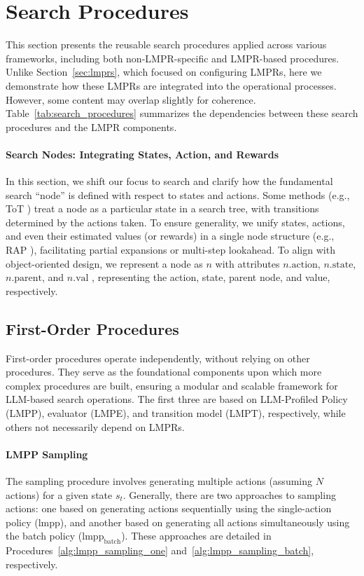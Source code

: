 

\section{Search Procedures}
\label{sec:procedures}
This section presents the reusable search procedures applied across various frameworks, including both non-LMPR-specific and LMPR-based procedures. Unlike Section~\ref{sec:lmprs}, which focused on configuring LMPRs, here we demonstrate how these LMPRs are integrated into the operational processes. However, some content may overlap slightly for coherence.
Table~\ref{tab:search_procedures} summarizes the dependencies between these search procedures and the LMPR components.



\paragraph{Search Nodes: Integrating States, Action, and Rewards}
In this section, we shift our focus to search and clarify how the fundamental search ``node'' is defined with respect to states and actions. Some methods (e.g., ToT \citep{yao2023tree}) treat a node as a particular state in a search tree, with transitions determined by the actions taken. To ensure generality, we unify states, actions, and even their estimated values (or rewards) in a single node structure (e.g., RAP \citep{hao-etal-2023-reasoning}), facilitating partial expansions or multi-step lookahead. To align with object-oriented design, we represent a node as $n$ with attributes $n.\text{action}$, $n.\text{state}$, $n.\text{parent}$, and $n.\text{val}$ , representing the action, state, parent node, and value, respectively.

\subsection{First-Order Procedures}
First-order procedures operate independently, without relying on other procedures. They serve as the foundational components upon which more complex procedures are built, ensuring a modular and scalable framework for LLM-based search operations.
The first three are based on LLM-Profiled Policy (LMPP), evaluator (LMPE), and transition model (LMPT), respectively, while others not necessarily depend on LMPRs.

\paragraph{LMPP Sampling}
The sampling procedure involves generating multiple actions (assuming $N$ actions) for a given state $s_t$. Generally, there are two approaches to sampling actions: one based on generating actions sequentially using the single-action policy ($\text{lmpp}$), and another based on generating all actions simultaneously using the batch policy ($\text{lmpp}_\text{batch}$). These approaches are detailed in Procedures~\ref{alg:lmpp_sampling_one} and~\ref{alg:lmpp_sampling_batch}, respectively.

